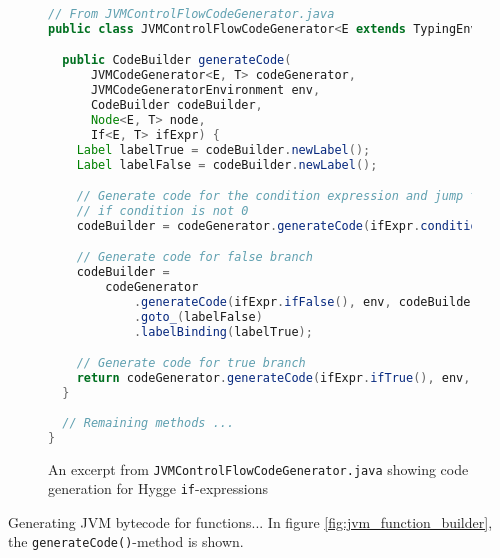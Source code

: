 \begin{figure}[H]
\centering 
\begin{lstlisting}[language=Java]
// From JVMControlFlowCodeGenerator.java
public class JVMControlFlowCodeGenerator<E extends TypingEnvironment, T extends Type> {

  public CodeBuilder generateCode(
      JVMCodeGenerator<E, T> codeGenerator,
      JVMCodeGeneratorEnvironment env,
      CodeBuilder codeBuilder,
      Node<E, T> node,
      If<E, T> ifExpr) {
    Label labelTrue = codeBuilder.newLabel();
    Label labelFalse = codeBuilder.newLabel();

    // Generate code for the condition expression and jump to true branch
    // if condition is not 0
    codeBuilder = codeGenerator.generateCode(ifExpr.condition(), env, codeBuilder).ifne(labelTrue);

    // Generate code for false branch
    codeBuilder =
        codeGenerator
            .generateCode(ifExpr.ifFalse(), env, codeBuilder)
            .goto_(labelFalse)
            .labelBinding(labelTrue);

    // Generate code for true branch
    return codeGenerator.generateCode(ifExpr.ifTrue(), env, codeBuilder).labelBinding(labelFalse);
  }
 
  // Remaining methods ...
}
\end{lstlisting}
\caption{An excerpt from \texttt{JVMControlFlowCodeGenerator.java} showing code generation for Hygge \texttt{if}-expressions}
\label{fig:jvm_if_expressions}
\end{figure}

Generating JVM bytecode for functions... In figure \ref{fig:jvm_function_builder}, the \texttt{generateCode()}-method is shown.

